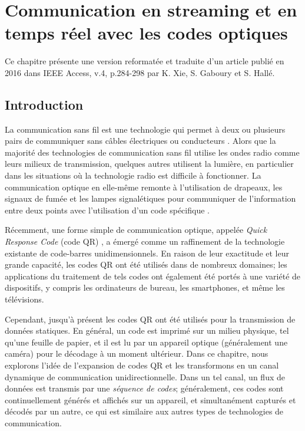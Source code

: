 
\chapter{Communication en streaming et en temps réel avec les codes optiques}

Ce chapitre présente une version reformatée et traduite d'un article publié en 2016 dans IEEE Access, v.4, p.284-298 par K. Xie, S. Gaboury et S. Hallé.

\section{Introduction}\label{sec:qr:intro} %

La communication sans fil est une technologie qui permet à deux ou plusieurs pairs de communiquer sans câbles électriques ou conducteurs \citep{tse2005fundamentals}. Alors que la majorité des technologies de communication sans fil utilise les ondes radio comme leurs milieux de transmission, quelques autres utilisent la lumière, en particulier dans les situations où la technologie radio est difficile à fonctionner. La communication optique en elle-même remonte à l'utilisation de drapeaux, les signaux de fumée et les lampes signalétiques pour communiquer de l'information entre deux points avec l'utilisation d'un code spécifique \citep{burns2004}.

Récemment, une forme simple de communication optique, appelée \emph{Quick Response Code} (code QR) \citep{qrcode-about}, a émergé comme un raffinement de la technologie existante de code-barres unidimensionnels. En raison de leur exactitude et leur grande capacité, les codes QR ont été utilisés dans de nombreux domaines; les applications du traitement de tels codes ont également été portés à une variété de dispositifs, y compris les ordinateurs de bureau, les smartphones, et même les télévisions.

Cependant, jusqu'à présent les codes QR ont été utilisés pour la transmission de données statiques. En général, un code est imprimé sur un milieu physique, tel qu'une feuille de papier, et il est lu par un appareil optique (généralement une caméra) pour le décodage à un moment ultérieur. Dans ce chapitre, nous explorons l'idée de l'expansion de codes QR et les transformons en un canal dynamique de communication unidirectionnelle. Dans un tel canal, un flux de données est transmis par une \emph{séquence de codes}; généralement, ces codes sont continuellement générés et affichés sur un appareil, et simultanément capturés et décodés par un autre, ce qui est similaire aux autres types de technologies de communication.

